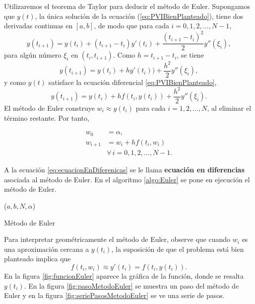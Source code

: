 Utilizaremos el teorema de Taylor para deducir el método de Euler. Supongamos que $y(t)$, la única solución de la ecuación 
(\ref{eq:PVIBienPlanteado}), tiene dos derivadas continuas en $[a,b]$, de modo que para cada $i=0,1,2,\dots,N-1$,
\[y(t_{i+1}) = y(t_i) + (t_{i+1} - t_i)y'(t_i) + \frac{(t_{i+1} - t_i)^2}{2}y''(\xi_i),\]
para algún número $\xi_i$ en $(t_i, t_{i+1})$. Como $h=t_{i+1} - t_i$, se tiene
\[y(t_{i+1}) = y(t_i) + hy'(t_i)) + \frac{h^2}{2}y''(\xi_i),\]
y como $y(t)$ satisface la ecuación diferencial \ref{eq:PVIBienPlanteado},
\begin{equation}
	y(t_{i+1}) = y(t_i) + hf(t_i, y(t_i)) + \frac{h^2}{2}y''(\xi_i).
	\label{eq:ySiguiente}
\end{equation}
El método de Euler construye $w_i\approx y(t_i)$ para cada $i=1,2,\dots,N$, al eliminar el término restante. Por tanto,
\begin{definition}
	\begin{align}
		w_0 &= \alpha, \nonumber\\ 
		w_{i+1} &= w_i + hf(t_i, w_i) \nonumber\\
		&\forall \, i=0,1,2,\dots ,N-1. 
		\label{eq:ecuacionEnDiferenicas}
	\end{align}
\end{definition}

A la ecuación \ref{eq:ecuacionEnDiferenicas} se le llama \textbf{ecuación en diferencias} asociada al método de Euler. En el algoritmo 
\ref{algo:Euler} se pone en ejecución el método de Euler.

\begin{algorithm}[h]
	\euler ($a,b,N,\alpha$) 
\caption{Método de Euler}
\label{algo:Euler}
\end{algorithm}

Para interpretar geométricamente el método de Euler, observe que cuando $w_i$ es una aproximación cercana a $y(t_i)$, la suposición 
de que el problema está bien planteado implica que 
\[f(t_i,w_i) \approx y'(t_i) = f(t_i, y(t_i)).\]
En la figura \ref{fig:funcionEuler} aparece la gráfica de la función, donde se resalta $y(t_i)$. En la figura \ref{fig:pasoMetodoEuler} 
se muestra un paso del método de Euler y en la figura \ref{fig:seriePasosMetodoEuler} se ve una serie de pasos. 

